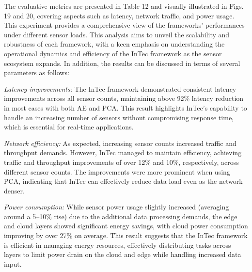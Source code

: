 \documentclass[11pt]{article}
\begin{document}
		The evaluative metrics are presented in Table 12 and visually illustrated in
	Figs. 19 and 20, covering aspects such as latency, network traffic, and power usage.
	This experiment provides a comprehensive view of the frameworks’ performances
	under different sensor loads. This analysis aims to unveil the scalability and robustness of each framework, with a keen emphasis on understanding the operational
	dynamics and efficiency of the InTec framework as the sensor ecosystem expands.
	In addition, the results can be discussed in terms of several parameters as follows:
	
	\textit{Latency improvements:} The InTec framework demonstrated consistent latency
	improvements across all sensor counts, maintaining above 92\% latency reduction in most cases with both AE and PCA. This result highlights InTec’s capability to handle an increasing number of sensors without compromising response time, which is essential for real-time applications.
	
	\textit{Network efficiency:} As expected, increasing sensor counts increased traffic and
	throughput demands. However, InTec managed to maintain efficiency, achieving
	traffic and throughput improvements of over 12\% and 10\%, respectively, across different sensor counts. The improvements were more prominent when using PCA,
	indicating that InTec can effectively reduce data load even as the network denser.
	
	\textit{Power consumption:} While sensor power usage slightly increased (averaging
	around a 5–10\% rise) due to the additional data processing demands, the edge and
	cloud layers showed significant energy savings, with cloud power consumption
	improving by over 27\% on average. This result suggests that the InTec framework
	is efficient in managing energy resources, effectively distributing tasks across layers to limit power drain on the cloud and edge while handling increased data input.
	
\end{document}
